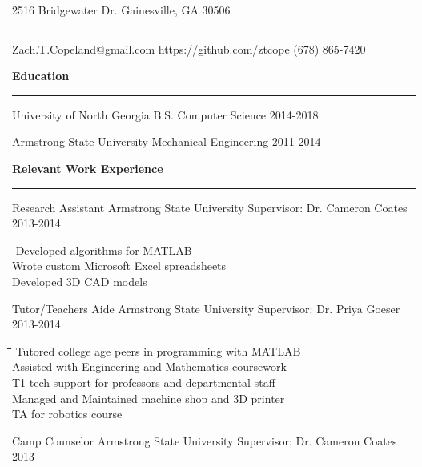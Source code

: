 \documentclass[12pt,letterpaper]{letter}
\begin{document}
\hfill 2516 Bridgewater Dr. Gainesville, GA 30506
\vspace{3pt}
\hrule \relax
Zach.T.Copeland@gmail.com \hfill https://github.com/ztcope \hfill(678) 865-7420

\noindent\textbf{Education}
\vspace{3pt}
\hrule \relax

University of North Georgia \hfill B.S. Computer Science \hfill 2014-2018

Armstrong State University \hfill Mechanical Engineering \hfill 2011-2014

\noindent\textbf{Relevant Work Experience}
\vspace{3pt}
\hrule \relax

Research Assistant \hfill Armstrong State University \hfill Supervisor: Dr. Cameron Coates \hfill 2013-2014

\begin{tabbing}
\hspace*{2cm}\=\hspace*{2cm}\=\hspace*{2cm}\=\hspace*{2cm}\= \kill
\> Developed algorithms for MATLAB\\[1ex]
\> Wrote custom Microsoft Excel spreadsheets\\[1ex]
\> Developed 3D CAD models\\
\end{tabbing}

Tutor/Teachers Aide \hfill Armstrong State University \hfill Supervisor: Dr. Priya Goeser \hfill 2013-2014

\begin{tabbing}
\hspace*{2cm}\=\hspace*{2cm}\=\hspace*{2cm}\=\hspace*{2cm}\= \kill
\> Tutored college age peers in programming with MATLAB\\[1ex]
\> Assisted with Engineering and Mathematics coursework\\[1ex]
\> T1 tech support for professors and departmental staff\\[1ex]
\> Managed and Maintained machine shop and 3D printer\\[1ex]
\> TA for robotics course\\
\end{tabbing}

Camp Counselor \hfill Armstrong State University \hfill Supervisor: Dr. Cameron Coates \hfill 2013
\end{document}
